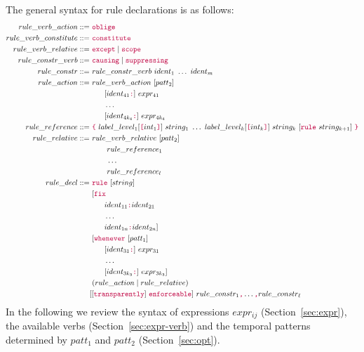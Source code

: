 \documentclass[runningheads]{llncs}
\newcommand{\kw}[1]{{\color{purple}\texttt{#1}}}
\begin{document}
The general syntax for rule declarations is as follows:
\begin{align*}
  rule\_verb\_action ::=&~\kw{oblige} \\
  rule\_verb\_constitute ::=&~\kw{constitute} \\
  rule\_verb\_relative ::=&~\kw{except} \mid \kw{scope}\\
  rule\_constr\_verb ::=&~\kw{causing} \mid \kw{suppressing}\\
  rule\_constr ::=&~rule\_constr\_verb~ident_1~\dots~ident_m\\
  rule\_action ::= &~rule\_verb\_action~[patt_2]\\
                   &\qquad [ident_{41}\kw{:}]~expr_{41}\\
                   &\qquad \dots\\
                   &\qquad [ident_{4{k_4}}\kw{:}]~expr_{4{k_4}}\\
  rule\_reference ::= &~\kw{\{}~
                      label\_level_1[\kw{[}int_1\kw{]}]~string_1
                      ~\dots~
                      label\_level_k[\kw{[}int_k\kw{]}]~string_{k}
                      ~[\kw{rule}~string_{k+1}]
                      ~\kw{\}} \\
  rule\_relative ::=&~rule\_verb\_relative~[patt_2] \\
                    &~\qquad rule\_reference_1 \\
                    &~\qquad\dots \\
                    &~\qquad rule\_reference_l \\
  rule\_decl ::=&~\kw{rule}~[string]\\
                &~[\kw{fix}\\
                &\qquad ident_{11}\kw{:} ident_{21}\\
                &\qquad \dots\\
                &\qquad ident_{1n}\kw{:} ident_{2n}]\\
                &~[\kw{whenever}~[patt_1]\\
                &\qquad [ident_{31}\kw{:}]~expr_{31}\\
                &\qquad \dots\\
                &\qquad [ident_{3{k_3}}\kw{:}]~expr_{3{k_3}}]\\
                &~(rule\_action\mid rule\_relative)\\
                &[[\kw{transparently}]~\kw{enforceable}]~rule\_constr_1\kw{,}\dots\kw{,}rule\_constr_\ell
\end{align*}
In the following we review the syntax of expressions $expr_{ij}$ (Section~\ref{sec:expr}), the available verbs (Section~\ref{sec:expr-verb}) and the temporal patterns determined by $patt_1$ and $patt_2$ (Section~\ref{sec:opt}).
\end{document}
